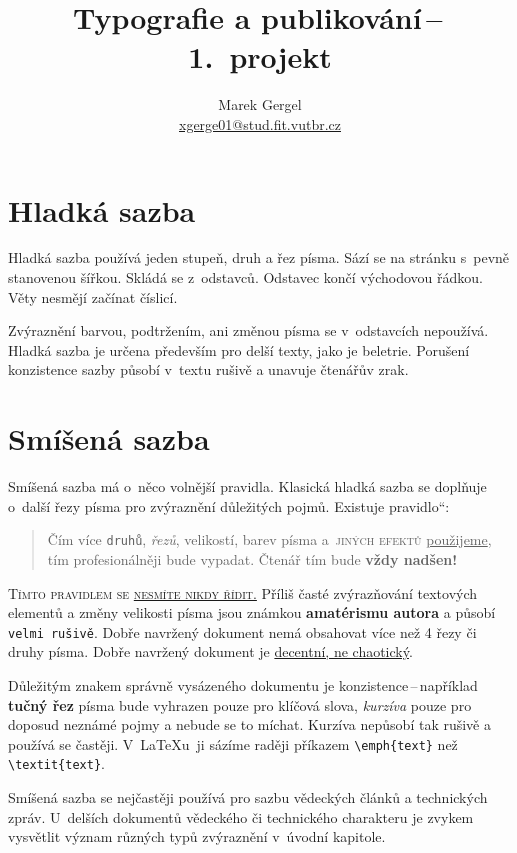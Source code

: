 \documentclass[a4paper, 10pt, twocolumn]{article}
\providecommand{\email}[1]{\href{mailto:#1}{#1}}
\providecommand{\uv}[1]{\quotedblbase#1\textquotedblleft}
\begin{document}
\title{Typografie a publikování\,--\,1.\ projekt}
\author{Marek Gergel\\\email{xgerge01@stud.fit.vutbr.cz}}
\date{}

\maketitle

\section{Hladká sazba}

Hladká sazba používá jeden stupeň, druh a řez písma.
Sází se na stránku s~pevně stanovenou šířkou.
Skládá se z~odstavců. Odstavec končí východovou řádkou.
Věty nesmějí začínat číslicí.
\par Zvýraznění barvou, podtržením, ani změnou písma se v~odstavcích nepoužívá.
Hladká sazba je určena především pro delší texty, jako je beletrie.
Porušení konzistence sazby působí v~textu rušivě a unavuje čtenářův zrak.

\section{Smíšená sazba}\label{sec:smisena}

Smíšená sazba má o~něco volnější pravidla.
Klasická hladká sazba se doplňuje o~další řezy písma pro zvýraznění důležitých pojmů.
Existuje \uv{pravidlo}:

\begin{quotation}
Čím více \verb|druhů|, \emph{řezů}, {\tiny{velikostí}}, {\color{green}barev} písma a~{\color{blue}\textsc{jiných efektů}} \underline{použijeme}, {\color{red}tím profesionálněji} bude {\selectfont{dokument}} vypadat.
Čtenář tím bude {\Huge \textbf{vždy nadšen!}}
\end{quotation}

\textsc{Tímto pravidlem se \underline{nesmíte nikdy řídit.}}
Příliš časté zvýrazňování textových elementů a změny {\scriptsize velikosti} písma jsou známkou \textbf{amatérismu autora} a působí \texttt{velmi rušivě}.
Dobře navržený dokument nemá obsahovat více než 4 řezy či druhy písma.
Dobře navržený dokument je \underline{decentní, ne chaotický}.
\par Důležitým znakem správně vysázeného dokumentu je konzistence\,--\,například \textbf{tučný řez} písma bude vyhrazen pouze pro klíčová slova, \emph{kurzíva} pouze pro doposud neznámé pojmy a nebude se to míchat.
Kurzíva nepůsobí tak rušivě a používá se častěji.
V~\LaTeX u~ji sázíme raději příkazem \verb|\emph{text}| než \verb|\textit{text}|.
\par Smíšená sazba se nejčastěji používá pro sazbu vědeckých článků a technických zpráv.
U~delších dokumentů vědeckého či technického charakteru je zvykem vysvětlit význam různých typů zvýraznění v~úvodní kapitole.
\end{document}
